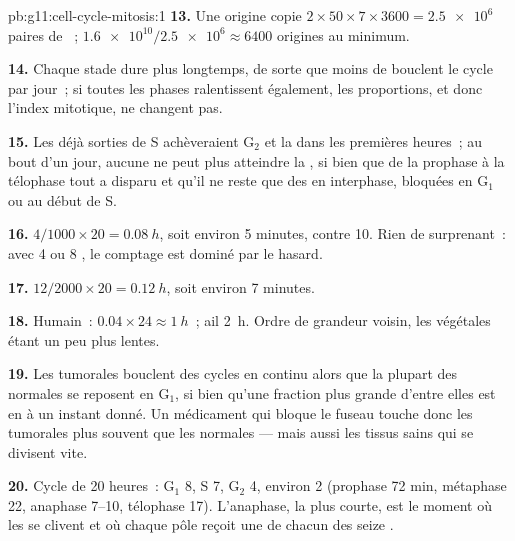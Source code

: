 \begin{solution}{pb:g11:cell-cycle-mitosis:1}
\textbf{13.} Une origine copie $2 \times 50 \times 7 \times 3600 =
\num{2.5e6}$ paires de ~; $\num{1.6e10}/\num{2.5e6} \approx 6400$
origines au minimum.

\textbf{14.} Chaque stade dure plus longtemps, de sorte que moins de
 bouclent le cycle par jour~; si toutes les phases ralentissent
également, les proportions, et donc l'index mitotique, ne changent pas.

\textbf{15.} Les  déjà sorties de S achèveraient $\mathrm{G_2}$
et la  dans les premières heures~; au bout d'un jour, aucune
 ne peut plus atteindre la , si bien que de la prophase à
la télophase tout a disparu et qu'il ne reste que des  en
interphase, bloquées en $\mathrm{G_1}$ ou au début de S.

\textbf{16.} $4/1000 \times 20 = \qty{0.08}{h}$, soit environ 5
minutes, contre 10. Rien de surprenant~: avec 4 ou 8 , le
comptage est dominé par le hasard.

\textbf{17.} $12/2000 \times 20 = \qty{0.12}{h}$, soit environ 7 minutes.

\textbf{18.} Humain~: $0.04 \times 24 \approx \qty{1}{h}$~; ail
\qty{2}{h}. Ordre de grandeur voisin, les  végétales étant un
peu plus lentes.

\textbf{19.} Les  tumorales bouclent des cycles en continu
alors que la plupart des  normales se reposent en
$\mathrm{G_1}$, si bien qu'une fraction plus grande d'entre elles est
en  à un instant donné. Un médicament qui bloque le fuseau touche
donc les  tumorales plus souvent que les normales --- mais
aussi les tissus sains qui se divisent vite.

\textbf{20.} Cycle de 20 heures~: $\mathrm{G_1}$ 8, S 7, $\mathrm{G_2}$
4,  environ 2 (prophase 72 min, métaphase 22, anaphase 7--10,
télophase 17). L'anaphase, la plus courte, est le moment où les
 se clivent et où chaque pôle reçoit une  de
chacun des seize .
\end{solution}
